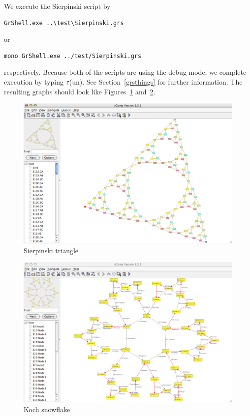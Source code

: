 We execute the Sierpinski script by
\begin{verbatim}
GrShell.exe ..\test\Sierpinski.grs
\end{verbatim}
or
\begin{verbatim}
mono GrShell.exe ../test/Sierpinski.grs
\end{verbatim}
respectively. Because both of the scripts are using the debug mode, we complete execution by typing \texttt{r}(un). See Section~\ref{grsthings} for further information. The resulting graphs should look like Figures~\ref{figsierp} and~\ref{figsnowflake}.
\begin{figure}[htbp]
  \centering
  \includegraphics[width=\textwidth]{fig/sierpinski}
  \caption{Sierpinski triangle}
  \label{figsierp}
\end{figure}
\begin{figure}[htbp]
  \centering
  \includegraphics[width=\textwidth]{fig/snowflake}
  \caption{Koch snowflake}
  \label{figsnowflake}
\end{figure}
\vfill\pagebreak

